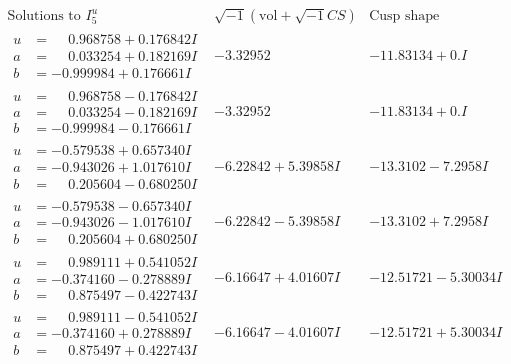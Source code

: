 \documentclass[1p]{elsarticle_modified}
\theoremstyle{definition}
\newcommand{\I}{\sqrt{-1}}
\begin{document}
$$\begin{array}{c|c|c}  
\text{Solutions to }I^u_{5}& \I (\text{vol} + \sqrt{-1}CS) & \text{Cusp shape}\\
 \hline 
\begin{aligned}
u &= \phantom{-}0.968758 + 0.176842 I \\
a &= \phantom{-}0.033254 + 0.182169 I \\
b &= -0.999984 + 0.176661 I\end{aligned}
 & -3.32952\phantom{ +0.000000I} & -11.83134 + 0. I\phantom{ +0.000000I} \\ \hline\begin{aligned}
u &= \phantom{-}0.968758 - 0.176842 I \\
a &= \phantom{-}0.033254 - 0.182169 I \\
b &= -0.999984 - 0.176661 I\end{aligned}
 & -3.32952\phantom{ +0.000000I} & -11.83134 + 0. I\phantom{ +0.000000I} \\ \hline\begin{aligned}
u &= -0.579538 + 0.657340 I \\
a &= -0.943026 + 1.017610 I \\
b &= \phantom{-}0.205604 - 0.680250 I\end{aligned}
 & -6.22842 + 5.39858 I & -13.3102 - 7.2958 I \\ \hline\begin{aligned}
u &= -0.579538 - 0.657340 I \\
a &= -0.943026 - 1.017610 I \\
b &= \phantom{-}0.205604 + 0.680250 I\end{aligned}
 & -6.22842 - 5.39858 I & -13.3102 + 7.2958 I \\ \hline\begin{aligned}
u &= \phantom{-}0.989111 + 0.541052 I \\
a &= -0.374160 - 0.278889 I \\
b &= \phantom{-}0.875497 - 0.422743 I\end{aligned}
 & -6.16647 + 4.01607 I & -12.51721 - 5.30034 I \\ \hline\begin{aligned}
u &= \phantom{-}0.989111 - 0.541052 I \\
a &= -0.374160 + 0.278889 I \\
b &= \phantom{-}0.875497 + 0.422743 I\end{aligned}
 & -6.16647 - 4.01607 I & -12.51721 + 5.30034 I \\ \hline\begin{aligned}

\end{aligned}
\end{array}$$
\end{document}

